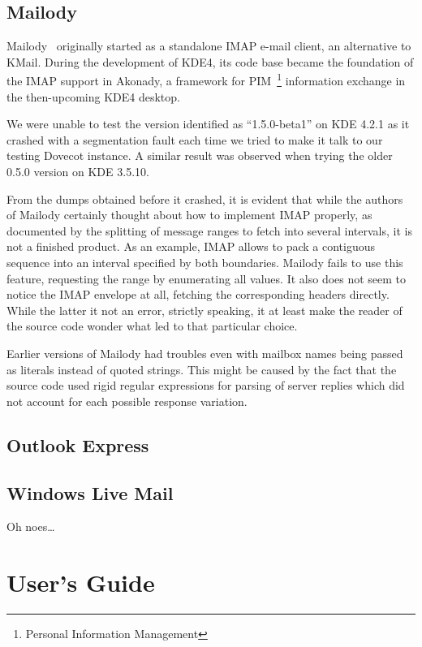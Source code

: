 \documentclass[12pt,notitlepage]{report}
\begin{document}
\section{Mailody}

Mailody~\cite{mailody} originally started as a standalone IMAP e-mail client, an
alternative to KMail.  During the development of KDE4, its code base became the
foundation of the IMAP support in Akonady, a framework for
PIM~\footnote{Personal Information Management} information exchange in the
then-upcoming KDE4 desktop.

We were unable to test the version identified as ``1.5.0-beta1'' on KDE 4.2.1 as
it crashed with a segmentation fault each time we tried to make it talk to our
testing Dovecot instance.  A similar result was observed when trying the older
0.5.0 version on KDE 3.5.10.

From the dumps obtained before it crashed, it is evident that while the authors
of Mailody certainly thought about how to implement IMAP properly, as documented
by the splitting of message ranges to fetch into several intervals, it is not a
finished product.  As an example, IMAP allows to pack a contiguous sequence into
an interval specified by both boundaries.  Mailody fails to use this feature,
requesting the range by enumerating all values.  It also does not seem to notice
the IMAP envelope at all, fetching the corresponding headers directly.  While
the latter it not an error, strictly speaking, it at least make the reader of
the source code wonder what led to that particular choice.

Earlier versions of Mailody had troubles even with mailbox names being passed as
literals instead of quoted strings.  This might be caused by the fact that the
source code used rigid regular expressions for parsing of server replies which
did not account for each possible response variation.

\section{Outlook Express}


\section{Windows Live Mail}

Oh noes\ldots

\chapter{User's Guide}
\label{users-guide}
\end{document}
